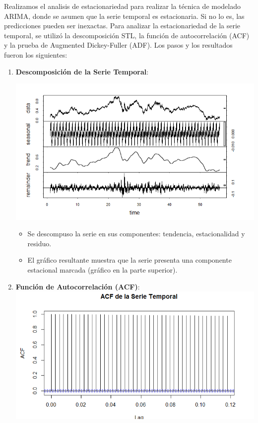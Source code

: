 \documentclass[
]{book}
\begin{document}
Realizamos el analisis de estacionariedad para realizar la técnica de modelado ARIMA, donde se asumen que la serie temporal es estacionaria. Si no lo es, las predicciones pueden ser inexactas. Para analizar la estacionariedad de la serie temporal, se utilizó la descomposición STL, la función de autocorrelación (ACF) y la prueba de Augmented Dickey-Fuller (ADF). Los pasos y los resultados fueron los siguientes:

\begin{enumerate}
\def\labelenumi{\arabic{enumi}.}
\item
  \textbf{Descomposición de la Serie Temporal}:

  \includegraphics{images/clipboard-2193911821.png}

  \begin{itemize}
  \item
    Se descompuso la serie en sus componentes: tendencia, estacionalidad y residuo.
  \item
    El gráfico resultante muestra que la serie presenta una componente estacional marcada (gráfico en la parte superior).
  \end{itemize}
\item
  \textbf{Función de Autocorrelación (ACF)}:\\
  \includegraphics{images/clipboard-928318317.png}


\end{enumerate}
\end{document}

